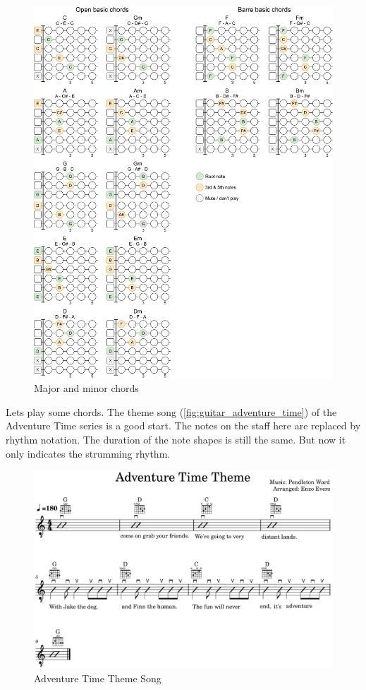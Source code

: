\begin{figure}[h]
	\centering
	\includegraphics[height=0.8\textheight]{../../Images/GuitarBasicChords.png}
	\caption{Major and minor chords}
	\label{fig:guitar_major_minor_chords}
\end{figure}

\clearpage

Lets play some chords. The theme song (\autoref{fig:guitar_adventure_time}) of the Adventure Time series is a good start. The notes on the staff here are replaced by rhythm notation. The duration of the note shapes is still the same. But now it only indicates the strumming rhythm.

\begin{figure}[h]
	\centering
	\includegraphics[width=\textwidth]{../../MuseScore/Guitar/GuitarAdventureTimeTheme.png}
	\caption{Adventure Time Theme Song}
	\label{fig:guitar_adventure_time}
\end{figure}

